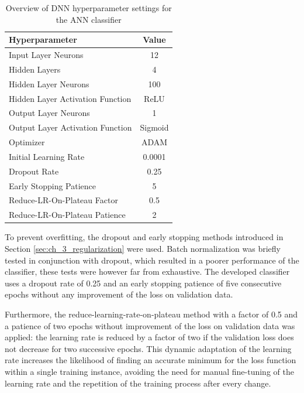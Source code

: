 \begin{table}[h]
    \caption{Overview of DNN hyperparameter settings for the ANN classifier}
    \label{tab:ch_4_ann_topology}
    \begin{center}
        \begin{tabular}{lc}
            \hline
            Hyperparameter & Value\\
            \hline
            Input Layer Neurons & 12\\
            Hidden Layers & 4\\
            Hidden Layer Neurons & 100\\
            Hidden Layer Activation Function & ReLU\\
            Output Layer Neurons & 1\\
            Output Layer Activation Function & Sigmoid\\
            Optimizer & ADAM\\
            Initial Learning Rate & 0.0001\\
            Dropout Rate & 0.25\\
            Early Stopping Patience & 5\\
            Reduce-LR-On-Plateau Factor & 0.5\\
            Reduce-LR-On-Plateau Patience & 2\\
            \hline
        \end{tabular}
    \end{center}
\end{table}

To prevent overfitting, the dropout and early stopping methods introduced in Section \ref{sec:ch_3_regularization} were used. Batch normalization was briefly tested in conjunction with dropout, which resulted in a poorer performance of the classifier, these tests were however far from exhaustive. The developed classifier uses a dropout rate of 0.25 and an early stopping patience of five consecutive epochs without any improvement of the loss on validation data.

Furthermore, the reduce-learning-rate-on-plateau method with a factor of 0.5 and a patience of two epochs without improvement of the loss on validation data was applied: the learning rate is reduced by a factor of two if the validation loss does not decrease for two successive epochs. This dynamic adaptation of the learning rate increases the likelihood of finding an accurate minimum for the loss function within a single training instance, avoiding the need for manual fine-tuning of the learning rate and the repetition of the training process after every change.

